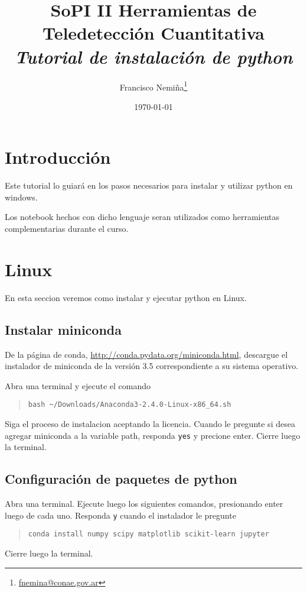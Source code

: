 \documentclass[hidelinks,12pt]{article}
\title{SoPI II \- Herramientas de Teledetecci\'on Cuantitativa \\ 
\emph{Tutorial de instalaci\'on de python}}
\author{Francisco
Nemi\~na\thanks{\href{mailto:fnemina@conae.govar}{fnemina@conae.gov.ar}}}
\affil{Unidad de Educaci\'on y Formaci\'on Masiva\\ 
    Comisi\'on Nacional de Actividades Espaciales}
\date{\today}
\begin{document}
\maketitle

\section*{Introducci\'on}
Este tutorial lo guiar\'a en los pasos necesarios para instalar y utilizar
python en windows.

Los notebook hechos con dicho lenguaje seran utilizados como herramientas
complementarias durante el curso.

\section{Linux}
En esta seccion veremos como instalar y ejecutar python en Linux.

\subsection{Instalar miniconda}

De la p\'agina de conda, \url{http://conda.pydata.org/miniconda.html}, descargue 
el instalador de miniconda de la versi\'on 3.5 correspondiente a su sistema operativo. 

Abra una terminal y ejecute el comando
\begin{quote}
\begin{verbatim}
bash ~/Downloads/Anaconda3-2.4.0-Linux-x86_64.sh
\end{verbatim}
\end{quote}
Siga el proceso de instalacion aceptando la licencia. Cuando le pregunte si
desea agregar miniconda a la variable path, responda \texttt{yes} y precione
enter. Cierre luego la terminal.

\subsection{Configuraci\'on de paquetes de python}

Abra una terminal. Ejecute luego los siguientes comandos, presionando enter
luego de cada uno. Responda \texttt{y} cuando el instalador le pregunte 
\begin{quote}
\begin{verbatim}
conda install numpy scipy matplotlib scikit-learn jupyter 
\end{verbatim}
\end{quote}
Cierre luego la terminal.
\end{document}
